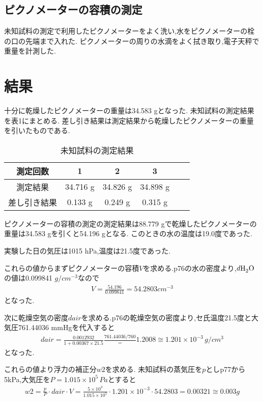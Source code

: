 \documentclass[a4j,10pt]{jarticle}
\begin{document}
  \subsection{ピクノメーターの容積の測定}
  未知試料の測定で利用したピクノメーターをよく洗い,水をピクノメーターの栓の口の先端まで入れた.
  ピクノメーターの周りの水滴をよく拭き取り,電子天秤で重量を計測した.

  \section{結果}
  十分に乾燥したピクノメーターの重量は34.583 gとなった.
  未知試料の測定結果を表1にまとめる.
  差し引き結果は測定結果から乾燥したピクノメーターの重量を引いたものである.
  \begin{table}[h]
    \begin{center}
      \caption{未知試料の測定結果}
      \begin{tabular}{c|ccccc}
        \hline
        測定回数 & 1 & 2 & 3  \\ \hline
        測定結果 & 34.716 g & 34.826 g & 34.898 g \\
        差し引き結果 & 0.133 g & 0.249 g & 0.315 g \\
        \hline
      \end{tabular}
    \end{center}
  \end{table}
  
  ピクノメーターの容積の測定の測定結果は88.779 gで乾燥したピクノメーターの重量は34.583 gを引くと54.196 gとなる.
  このときの水の温度は19.0度であった.

  実験した日の気圧は1015 hPa,温度は21.5度であった.


  これらの値からまずピクノメーターの容積$V$を求める.\cite{kiso}p76の水の密度より,$d\ce{H2O}$の値は0.099841 $g/cm^{-3}$なので
  \begin{eqnarray}
    \label{V}
    V = \frac{54.196}{0.099841} = 54.2803 cm^{-3}
  \end{eqnarray}
  となった.

  次に乾燥空気の密度$dair$を求める.\cite{kiso}p76の乾燥空気の密度より,セ氏温度21.5度と大気圧761.44036 mmHgを代入すると
  \begin{eqnarray}
    \label{p}
    dair = \frac{0.0012932}{1+0.00367\times21.5}\frac{761.44036/760} = 1.2008\cong 1.201 \times10^{-3} \,g/cm^3
  \end{eqnarray}
  となった.

  これらの値より浮力の補正分$w2$を求める.
  未知試料の蒸気圧を$p$とし\cite{kiso}p77から5kPa,大気圧を$P=1.015\times10^{5}\,Pa$とすると
  \begin{eqnarray}
    \label{w2}
    w2 = \frac{p}{P}\cdot dair \cdot V = \frac{5 \times10^3}{1.015 \times10^5} \cdot 1.201 \times10^{-3} \cdot 54.2803 = 0.00321\cong0.003 g
  \end{eqnarray}
  
\end{document}
